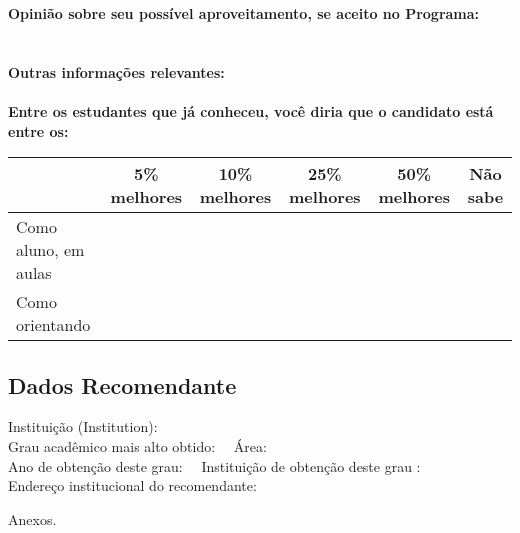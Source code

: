 \documentclass[11pt]{article}
\begin{document}
\textbf{Opinião sobre seu possível aproveitamento, se aceito no Programa:}
\\\\ 
\\
\textbf{Outras informações relevantes:} \\
\\[0.3cm]
\textbf{Entre os estudantes que já conheceu, você diria que o candidato está entre os:}
\\
\begin{tabular}{|l|c|c|c|c|c|}
\hline
 & 5\% melhores & 10\% melhores & 25\% melhores & 50\% melhores & Não sabe \\
\hline
Como aluno, em aulas &  &  &  &  & \\
\hline
Como orientando &  &  &  &  & \\
\hline
\end{tabular}
\subsection*{Dados Recomendante} 
	Instituição (Institution): 
\\ 
	Grau acadêmico mais alto obtido: 
	\ \ Área: 
	\\
	Ano de obtenção deste grau: 
	\ \ 
	Instituição de obtenção deste grau : 
	\\ 
	Endereço institucional do recomendante: \\  
\begin{center}
Anexos.
\end{center}
\end{document}

